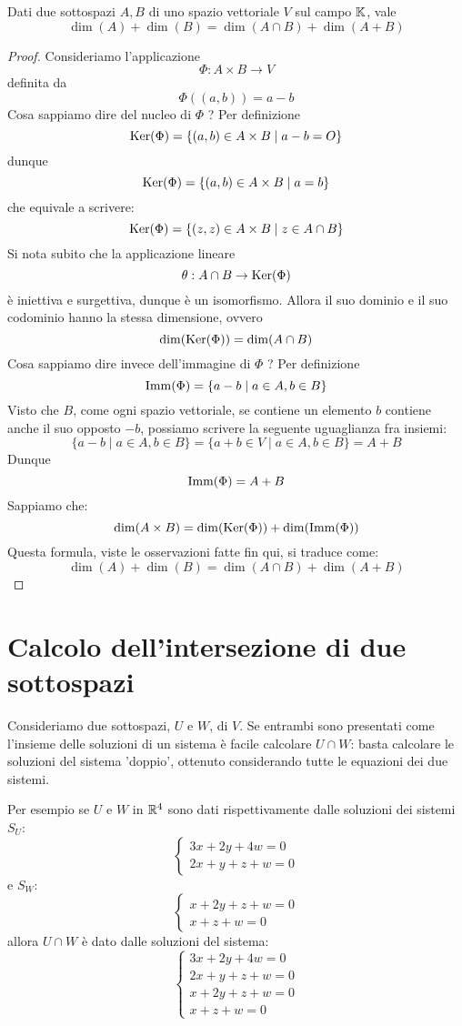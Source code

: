 \begin{theorem}[Grassmann]
	Dati due sottospazi $A, B$ di uno spazio vettoriale $V$ sul campo
	$\mathbb{K}$, vale
	\[
		\dim(A) + \dim(B) = \dim(A \cap B) + \dim(A + B)
	\]
	\begin{proof}
		Consideriamo l'applicazione
		\[
			\Phi : A \times B \to V
		\]
		definita da
		\[ \Phi((a, b)) = a - b \]
		Cosa sappiamo dire del nucleo di $\Phi$ ? Per definizione
		\[
			\operatorname{Ker}(\Phi) = \{(a, b) \in A \times B \mid a - b = O\}
		\]
		dunque
		\[
			\operatorname{Ker}(\Phi) = \{(a, b) \in A \times B \mid a = b\}
		\]
		che equivale a scrivere:
		\[
			\operatorname{Ker}(\Phi) = \{(z, z) \in A \times B \mid z \in A \cap B\}
		\]
		Si nota subito che la applicazione lineare
		\[ \theta : A \cap B \to \operatorname{Ker}(\Phi) \]
		è iniettiva e surgettiva, dunque è un isomorfismo. Allora il suo dominio e
		il suo codominio hanno la stessa dimensione, ovvero
		\[
			\dim(\operatorname{Ker}(\Phi)) = \dim(A \cap B)
		\]
		Cosa sappiamo dire invece dell'immagine di $\Phi$ ? Per definizione
		\[
			\operatorname{Imm}(\Phi) = \{a - b \mid a \in A, b \in B\}
		\]
		Visto che $B$, come ogni spazio vettoriale, se contiene un elemento
		$b$ contiene anche il suo opposto $-b$, possiamo scrivere la seguente
		uguaglianza fra insiemi:
		\[
			\{ a - b \mid a \in A, b \in B \} =
			\{ a + b \in V \mid a \in A, b \in B \} =
			A + B
		\]
		Dunque
		\[
			\operatorname{Imm}(\Phi) = A + B
		\]
		Sappiamo che:
		\[
			\dim(A \times B) = \dim(\operatorname{Ker}(\Phi)) + \dim(\operatorname{Imm}(\Phi))
		\]
		Questa formula, viste le osservazioni fatte fin qui, si traduce come:
		\[
			\dim(A) + \dim(B) = \dim(A \cap B) + \dim(A + B)
		\]
	\end{proof}
\end{theorem}

\section{Calcolo dell'intersezione di due sottospazi}
Consideriamo due sottospazi, $U$ e $W$, di $V$. Se entrambi sono presentati
come l'insieme delle soluzioni di un sistema è facile calcolare $U \cap W$:
basta calcolare le soluzioni del sistema 'doppio', ottenuto considerando tutte
le equazioni dei due sistemi.

Per esempio se $U$ e $W$ in $\mathbb{R}^4$ sono dati rispettivamente dalle
soluzioni dei sistemi $S_U$:
\[
	\begin{cases}
		3x + 2y + 4w = 0 \\
		2x + y + z + w = 0
	\end{cases}
\]
e $S_W$:
\[
	\begin{cases}
		x + 2y + z + w = 0 \\
		x + z + w = 0
	\end{cases}
\]
allora $U \cap W$ è dato dalle soluzioni del sistema:
\[
	\begin{cases}
		3x + 2y + 4w = 0   \\
		2x + y + z + w = 0 \\
		x + 2y + z + w = 0 \\
		x + z + w = 0
	\end{cases}
\]

